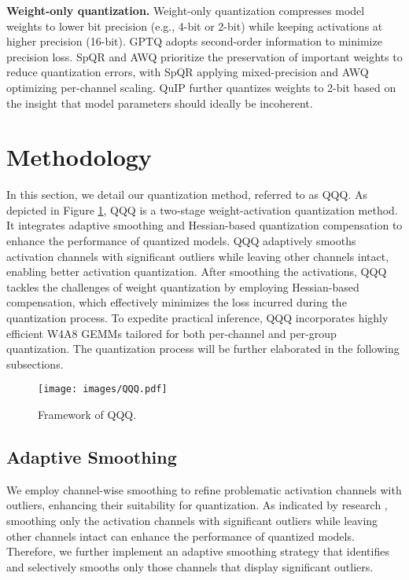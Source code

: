 \textbf{Weight-only quantization.} Weight-only quantization compresses model weights to lower bit precision (e.g., 4-bit or 2-bit) while keeping activations at higher precision (16-bit). {GPTQ \citep{frantar2022gptq} adopts second-order information to minimize precision loss.} SpQR \citep{dettmers2023spqr} and AWQ \citep{lin2023awq} prioritize the preservation of important weights to reduce quantization errors, with SpQR applying mixed-precision and AWQ optimizing per-channel scaling. QuIP \citep{chee2024quip} further quantizes weights to 2-bit based on the insight that model parameters should ideally be incoherent.

\section{Methodology}\label{section:sec4}
In this section, we detail our quantization method, referred to as QQQ. As depicted in Figure \ref{fig:fig1}, QQQ is a two-stage weight-activation quantization method.
It integrates adaptive smoothing and Hessian-based quantization compensation to enhance the performance of quantized models. QQQ adaptively smooths activation channels with significant outliers while leaving other channels intact, enabling better activation quantization.
After smoothing the activations, QQQ tackles the challenges of weight quantization by employing Hessian-based compensation, which effectively minimizes the loss incurred during the quantization process.
To expedite practical inference, QQQ incorporates highly efficient W4A8 GEMMs tailored for both per-channel and per-group quantization. The quantization process will be further elaborated in the following subsections.

\begin{figure}[ht]
\centering
\texttt{[image: images/QQQ.pdf]}
\caption{Framework of QQQ.}
\label{fig:fig1}
\vspace{-0.1in}
\end{figure}

\subsection{Adaptive Smoothing}
We employ channel-wise smoothing to refine problematic activation channels with outliers, enhancing their suitability for quantization. As indicated by research \citep{wei2023outlier}, smoothing only the activation channels with significant outliers while leaving other channels intact can enhance the performance of quantized models. Therefore, we further implement an adaptive smoothing strategy that identifies and selectively smooths only those channels that display significant outliers.

